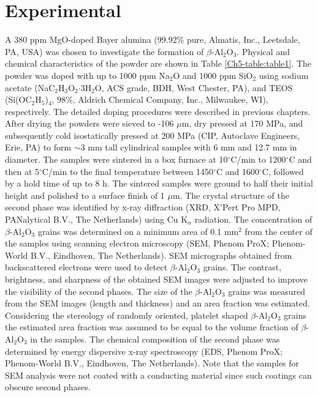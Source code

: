 \section{Experimental}
A 380 ppm MgO-doped Bayer alumina (99.92\% pure, Almatis, Inc., Leetsdale, PA, USA) was chosen to investigate the formation of $\beta$-Al$_{2}$O$_{3}$. Physical and chemical characteristics of the powder are shown in Table \ref{Ch5-table:table1}. The powder was doped with up to 1000 ppm Na$_{2}$O and 1000 ppm SiO$_{2}$ using sodium acetate (NaC$_{2}$H$_{3}$O$_{2}$$\cdot$3H$_{2}$O, ACS grade, BDH, West Chester, PA), and TEOS (Si(OC$_{2}$H$_{5}$)$_{4}$, 98\%, Aldrich Chemical Company, Inc., Milwaukee, WI), respectively. The detailed doping procedures were described in previous chapters. After drying the powders were sieved to -106 $\mu$m, dry pressed at 170 MPa, and subsequently cold isostatically pressed at 200 MPa (CIP, Autoclave Engineers, Erie, PA) to form $\sim$3 mm tall cylindrical samples with 6 mm and 12.7 mm in diameter. The samples were sintered in a box furnace at 10$^{\circ}$C/min to 1200$^{\circ}$C and then at 5$^{\circ}$C/min to the final temperature between 1450$^{\circ}$C and 1600$^{\circ}$C, followed by a hold time of up to 8 h. The sintered samples were ground to half their initial height and polished to a surface finish of 1 $\mu$m. The crystal structure of the second phase was identified by x-ray diffraction (XRD, X'Pert Pro MPD, PANalytical B.V., The Netherlands) using Cu K$_{\alpha}$ radiation. The concentration of $\beta$-Al$_{2}$O$_{3}$ grains was determined on a minimum area of 0.1 mm$^{2}$ from the center of the samples using scanning electron microscopy (SEM, Phenom ProX; Phenom-World B.V., Eindhoven, The Netherlands). SEM micrographs obtained from backscattered electrons were used to detect $\beta$-Al$_{2}$O$_{3}$ grains. The contrast, brightness, and sharpness of the obtained SEM images were adjusted to improve the visibility of the second phases. The size of the $\beta$-Al$_{2}$O$_{3}$ grains was measured from the SEM images (length and thickness) and an area fraction was estimated. Considering the stereology of randomly oriented, platelet shaped $\beta$-Al$_{2}$O$_{3}$ grains \cite{Underwood1972} the estimated area fraction was assumed to be equal to the volume fraction of $\beta$-Al$_{2}$O$_{3}$ in the samples. The chemical composition of the second phase was determined by energy dispersive x-ray spectroscopy (EDS, Phenom ProX; Phenom-World B.V., Eindhoven, The Netherlands). Note that the samples for SEM analysis were not coated with a conducting material since such coatings can obscure second phases. 

